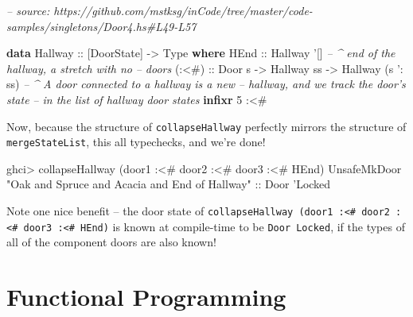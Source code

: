 \documentclass[]{article}
\newenvironment{Shaded}{}{}
\newcommand{\CommentTok}[1]{\textcolor[rgb]{0.38,0.63,0.69}{\textit{#1}}}
\newcommand{\DataTypeTok}[1]{\textcolor[rgb]{0.56,0.13,0.00}{#1}}
\newcommand{\DecValTok}[1]{\textcolor[rgb]{0.25,0.63,0.44}{#1}}
\newcommand{\FunctionTok}[1]{\textcolor[rgb]{0.02,0.16,0.49}{#1}}
\newcommand{\KeywordTok}[1]{\textcolor[rgb]{0.00,0.44,0.13}{\textbf{#1}}}
\newcommand{\NormalTok}[1]{#1}
\newcommand{\OtherTok}[1]{\textcolor[rgb]{0.00,0.44,0.13}{#1}}
\newcommand{\StringTok}[1]{\textcolor[rgb]{0.25,0.44,0.63}{#1}}
\begin{document}
\begin{Shaded}
\begin{Highlighting}[]
\CommentTok{-- source: https://github.com/mstksg/inCode/tree/master/code-samples/singletons/Door4.hs#L49-L57}

\KeywordTok{data} \DataTypeTok{Hallway}\OtherTok{ ::}\NormalTok{ [}\DataTypeTok{DoorState}\NormalTok{] }\OtherTok{->} \DataTypeTok{Type} \KeywordTok{where}
    \DataTypeTok{HEnd}\OtherTok{  ::} \DataTypeTok{Hallway}\NormalTok{ '[]        }\CommentTok{-- ^ end of the hallway, a stretch with no}
                                \CommentTok{--   doors}
\OtherTok{    (:<#) ::} \DataTypeTok{Door}\NormalTok{ s}
          \OtherTok{->} \DataTypeTok{Hallway}\NormalTok{ ss}
          \OtherTok{->} \DataTypeTok{Hallway}\NormalTok{ (s '}\FunctionTok{:}\NormalTok{ ss)  }\CommentTok{-- ^ A door connected to a hallway is a new}
                                \CommentTok{--   hallway, and we track the door's state}
                                \CommentTok{--   in the list of hallway door states}
\KeywordTok{infixr} \DecValTok{5} \FunctionTok{:<#}
\end{Highlighting}
\end{Shaded}

Now, because the structure of \texttt{collapseHallway} perfectly mirrors the
structure of \texttt{mergeStateList}, this all typechecks, and we're done!

\begin{Shaded}
\begin{Highlighting}[]
\NormalTok{ghci}\FunctionTok{>}\NormalTok{ collapseHallway (door1 }\FunctionTok{:<#}\NormalTok{ door2 }\FunctionTok{:<#}\NormalTok{ door3 }\FunctionTok{:<#} \DataTypeTok{HEnd}\NormalTok{)}
\DataTypeTok{UnsafeMkDoor} \StringTok{"Oak and Spruce and Acacia and End of Hallway"}
\OtherTok{    ::} \DataTypeTok{Door}\NormalTok{ '}\DataTypeTok{Locked}
\end{Highlighting}
\end{Shaded}

Note one nice benefit -- the door state of
\texttt{collapseHallway\ (door1\ :\textless{}\#\ door2\ :\textless{}\#\ door3\ :\textless{}\#\ HEnd)}
is known at compile-time to be \texttt{Door\ \textquotesingle{}Locked}, if the
types of all of the component doors are also known!

\hypertarget{functional-programming}{%
\section{Functional Programming}\label{functional-programming}}
\end{document}

